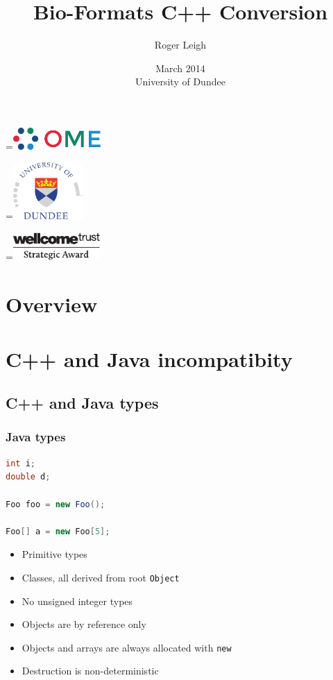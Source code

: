 \documentclass{beamer}
\title{Bio-Formats C++ Conversion}
\author{Roger Leigh}
\date{March 2014\\University of Dundee}
\newcommand*{\vcenteredhbox}[1]{\begingroup
\setbox0=\hbox{#1}\parbox{\wd0}{\box0}\endgroup}
\begin{document}
\begin{frame}[plain]
  \titlepage
  \begin{center}
    \vcenteredhbox{\includegraphics[width=0.25\textwidth]{ome}} \hfill
    \vcenteredhbox{\includegraphics[width=0.2\textwidth]{dundee}}\hfill
    \vcenteredhbox{\includegraphics[width=0.25\textwidth]{wellcome}}
  \end{center}
\end{frame}

\section*{Overview}

\section{C++ and Java incompatibity}
\subsection{C++ and Java types}

\begin{frame}[fragile]
  \frametitle{Java types}
  \begin{lstlisting}[language=Java]
int i;
double d;

Foo foo = new Foo();

Foo[] a = new Foo[5];
\end{lstlisting}
  \begin{itemize}
  \item Primitive types
  \item Classes, all derived from root \texttt{Object}
  \item No unsigned integer types
  \item Objects are by reference only
  \item Objects and arrays are always allocated with \texttt{new}
  \item Destruction is non-deterministic
  \end{itemize}
\end{frame}
\end{document}
